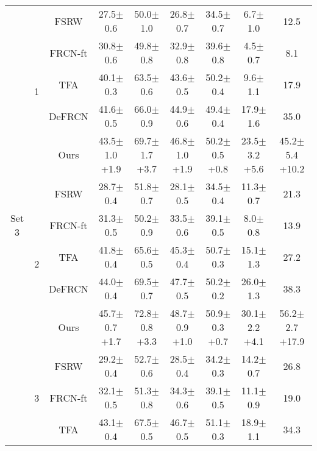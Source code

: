 \documentclass{article}
\begin{document}
\begin{table}[hbt!]
\begin{adjustbox}{width=0.79\textwidth}
{\begin{tabular}{c|c|c|ccc|c|cc}
         \midrule
         \multirow{25}{*}{ Set 3}&\multirow{5}{*}{1}&FSRW \cite{metayolo} &27.5$\pm$0.6&50.0$\pm$1.0&26.8$\pm$0.7& 34.5$\pm$0.7&6.7$\pm$1.0&12.5 \\
         &&FRCN-ft \cite{metarcnn}&30.8$\pm$0.6&49.8$\pm$0.8&32.9$\pm$0.8&39.6$\pm$0.8&4.5$\pm$0.7&8.1\\
         &&TFA \cite{tfa}&40.1$\pm$0.3&63.5$\pm$0.6&43.6$\pm$0.5&50.2$\pm$0.4&9.6$\pm$1.1&17.9\\
         && DeFRCN \cite{defrcn}&41.6$\pm$0.5&66.0$\pm$0.9&44.9$\pm$0.6&49.4$\pm$0.4&17.9$\pm$1.6&35.0\\
         && \cellcolor{gray!30}Ours&\cellcolor{gray!30}43.5$\pm$1.0 {\scriptsize \color{red}+1.9}&\cellcolor{gray!30}69.7$\pm$1.7 {\scriptsize \color{red}+3.7}&\cellcolor{gray!30}46.8$\pm$1.0 {\scriptsize \color{red}+1.9}&\cellcolor{gray!30}50.2$\pm$0.5 {\scriptsize \color{red}+0.8}&\cellcolor{gray!30}23.5$\pm$3.2 {\scriptsize \color{red}+5.6}&\cellcolor{gray!30}45.2$\pm$5.4 {\scriptsize \color{red}+10.2}\\
         \cmidrule{2-9}
         &\multirow{5}{*}{2}&FSRW \cite{metayolo} & 28.7$\pm$0.4&51.8$\pm$0.7&28.1$\pm$0.5&34.5$\pm$0.4&11.3$\pm$0.7&21.3 \\
         &&FRCN-ft \cite{metarcnn}&31.3$\pm$0.5&50.2$\pm$0.9&33.5$\pm$0.6&39.1$\pm$0.5&8.0$\pm$0.8&13.9\\
         &&TFA \cite{tfa}&41.8$\pm$0.4&65.6$\pm$0.5&45.3$\pm$0.4&50.7$\pm$0.3&15.1$\pm$1.3&27.2\\
         &&DeFRCN \cite{defrcn}&44.0$\pm$0.4&69.5$\pm$0.7&47.7$\pm$0.5&50.2$\pm$0.2&26.0$\pm$1.3&38.3\\
         && \cellcolor{gray!30}Ours&\cellcolor{gray!30}45.7$\pm$0.7 {\scriptsize \color{red}+1.7}&\cellcolor{gray!30}72.8$\pm$0.8 {\scriptsize \color{red}+3.3}&\cellcolor{gray!30}48.7$\pm$0.9 {\scriptsize \color{red}+1.0}&\cellcolor{gray!30}50.9$\pm$0.3 {\scriptsize \color{red}+0.7}&\cellcolor{gray!30}30.1$\pm$2.2{ \scriptsize \color{red}+4.1}&\cellcolor{gray!30}56.2$\pm$2.7 {\scriptsize \color{red}+17.9}\\
         \cmidrule{2-9}
         &\multirow{5}{*}{3}&FSRW \cite{metayolo} &29.2$\pm$0.4&52.7$\pm$0.6&28.5$\pm$0.4&34.2$\pm$0.3&14.2$\pm$0.7&26.8  \\
         &&FRCN-ft \cite{metarcnn}&32.1$\pm$0.5&51.3$\pm$0.8&34.3$\pm$0.6&39.1$\pm$0.5&11.1$\pm$0.9&19.0\\
         &&TFA \cite{tfa}&43.1$\pm$0.4&67.5$\pm$0.5&46.7$\pm$0.5&51.1$\pm$0.3&18.9$\pm$1.1&34.3\\

\end{tabular}}
\end{adjustbox}
\end{table}
\end{document}
